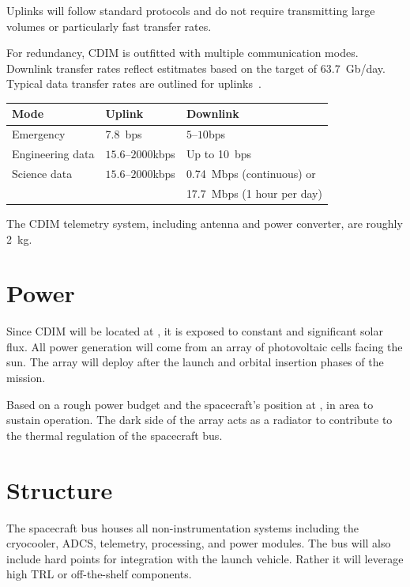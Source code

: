 \documentclass{ws-jai}
\begin{document}
Uplinks will follow standard protocols and do not require transmitting large volumes or particularly fast transfer rates.

\begin{wstable}[htp]
  \caption{For redundancy, CDIM is outfitted with multiple communication modes. Downlink transfer rates reflect estitmates based on the target of \SI{63.7}{Gb/day}. Typical data transfer rates are outlined for uplinks~\cite{smad2015}.
\label{tab:telemetry}}
  \begin{tabular}{@{}lll@{}} \toprule
    Mode & Uplink & Downlink \\ \midrule
    Emergency & \SI{7.8}{bps} & $5$--$10$\si{bps} \\
    Engineering data & $15.6$--$2000$\si{kbps} & Up to \SI{10}{bps} \\
    Science data & $15.6$--$2000$\si{kbps} & \SI{0.74}{Mbps} (continuous) or \\
    & & \SI{17.7}{Mbps} (1 hour per day)\\\bottomrule
  \end{tabular}
\end{wstable}
The CDIM telemetry system, including antenna and power converter, are roughly \SI{2}{kg}.

\section{Power}
\label{sec:power}
Since CDIM will be located at \Ltwo, it is exposed to constant and significant solar flux.
All power generation will come from an array of photovoltaic cells facing the sun.
The array will deploy after the launch and orbital insertion phases of the mission.

Based on a rough power budget and the spacecraft's position at \Ltwo,  in area to sustain operation.
The dark side of the array acts as a radiator to contribute to the thermal regulation of the spacecraft bus.


\section{Structure}
\label{sec:structure}
The spacecraft bus houses all non-instrumentation systems including the cryocooler, ADCS, telemetry, processing, and power modules.
The bus will also include hard points for integration with the launch vehicle.
 Rather it will leverage high TRL or off-the-shelf components.
\end{document}
